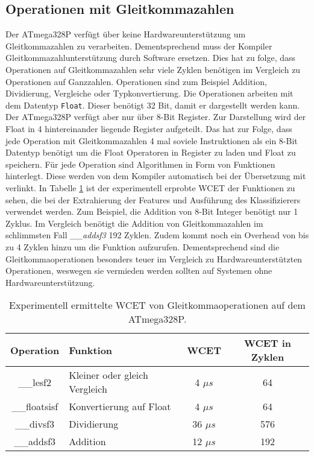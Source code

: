 \subsection{Operationen mit Gleitkommazahlen}
Der ATmega328P verfügt über keine Hardwareunterstützung um Gleitkommazahlen zu verarbeiten. Dementsprechend muss der Kompiler Gleitkommazahlunterstützung durch Software ersetzen. Dies hat zu folge, dass Operationen
auf Gleitkommazahlen sehr viele Zyklen benötigen im Vergleich zu Operationen auf Ganzzahlen. Operationen sind zum Beispiel Addition, Dividierung, Vergleiche oder Typkonvertierung.
\newline
\newline
Die Operationen arbeiten mit dem Datentyp \texttt{Float}. Dieser benötigt 32 Bit, damit er dargestellt werden kann. Der ATmega328P verfügt aber nur über 8-Bit Register. Zur Darstellung wird der Float in 4 hintereinander
liegende Register aufgeteilt. Das hat zur Folge, dass jede Operation mit Gleitkommazahlen 4 mal soviele Instruktionen als ein 8-Bit Datentyp benötigt um die Float Operatoren in Register zu laden und Float zu speichern.
\newline
\newline
Für jede Operation sind Algorithmen in Form von Funktionen hinterlegt. Diese werden von dem Kompiler automatisch bei der Übersetzung mit verlinkt. In Tabelle \ref{tab:float_operations} ist der experimentell erprobte WCET der
Funktionen zu sehen, die bei der Extrahierung der Features und Ausführung des Klassifizierers verwendet werden. Zum Beispiel, die Addition von 8-Bit Integer benötigt nur 1 Zyklus. Im Vergleich benötigt die Addition
von Gleitkommazahlen im schlimmsten Fall \textit{\_\_addsf3} 192 Zyklen. Zudem kommt noch ein Overhead von bis zu 4 Zyklen hinzu um die Funktion aufzurufen. Dementsprechend sind die Gleitkommaoperationen besonders
teuer im Vergleich zu Hardwareunterstützten Operationen, weswegen sie vermieden werden sollten auf Systemen ohne Hardwareunterstützung.
\begin{table}[h!]
    \centering
    \begin{tabular}{ | c | l | c | c |}
        \hline
        Operation & Funktion & WCET & WCET in Zyklen \\\hline
        \_\_lesf2 & Kleiner oder gleich Vergleich & 4 $\mu s$ & 64 \\\hline
        \_\_floatsisf & Konvertierung auf Float & 4 $\mu s$ & 64 \\\hline
        \_\_divsf3 & Dividierung & 36 $\mu s$ & 576 \\\hline
        \_\_addsf3 & Addition & 12 $\mu s$ & 192 \\\hline
    \end{tabular}
    \caption{Experimentell ermittelte WCET von Gleitkommaoperationen auf dem ATmega328P.}
    \label{tab:float_operations}
\end{table}